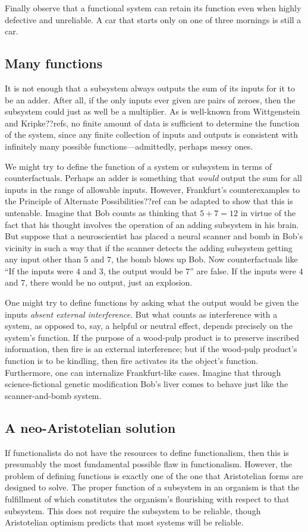 Finally observe that a functional system can retain its function even when highly defective and unreliable. A car that starts only 
on one of three mornings is still a car. 

\subsection{Many functions}
It is not enough that a subsystem always outputs the sum of its inputs for it to be an adder. After all, if the only inputs ever
given are pairs of zeroes, then the subsystem could just as well be a multiplier. As is well-known from Wittgenstein and Kripke??refs,
no finite amount of data is sufficient to determine the function of the system, since any finite collection of inputs and outputs is
consistent with infinitely many possible functions---admittedly, perhaps messy ones.

We might try to define the function of a system or subsystem in terms of counterfactuals. Perhaps an adder is something that \textit{would}
output the sum for all inputs in the range of allowable inputs. However, Frankfurt's counterexamples to the Principle of Alternate
Possibilities??ref can be adapted to show that this is untenable. Imagine that Bob counts as thinking that $5+7=12$ in virtue of the 
fact that his thought involves the operation of an adding subsystem in his brain. But suppose that a neuroscientist has placed a neural
scanner and bomb in Bob's vicinity in such a way that if the scanner detects the adding subsystem getting any input other than 
$5$ and $7$, the bomb blows up Bob. Now counterfactuals like ``If the inputs were $4$ and $3$, the output would be $7$'' are false.
If the inputs were $4$ and $7$, there would be no output, just an explosion.

One might try to define functions by asking what the output would be given the inputs \textit{absent external interference}. 
But what counts as interference with a system, as opposed to, say, a helpful or neutral effect, depends precisely on the system's
function. If the purpose of a wood-pulp product is to preserve inscribed information, then fire is an external interference;
but if the wood-pulp product's function is to be kindling, then fire activates its the object's function. 
Furthermore, one can internalize Frankfurt-like cases. Imagine that through science-fictional genetic modification Bob's liver
comes to behave just like the scanner-and-bomb system. 

\subsection{A neo-Aristotelian solution}
If functionalists do not have the resources to define functionalism, then this is presumably the most fundamental possible flaw
in functionalism. However, the problem of defining functions is exactly one of the one that Aristotelian forms are designed to solve.  The proper function
of a subsystem in an organism is that the fulfillment of which constitutes the organism's flourishing with respect to that subsystem.
This does not require the subsystem to be reliable, though Aristotelian optimism predicts that most systems will be reliable. 

